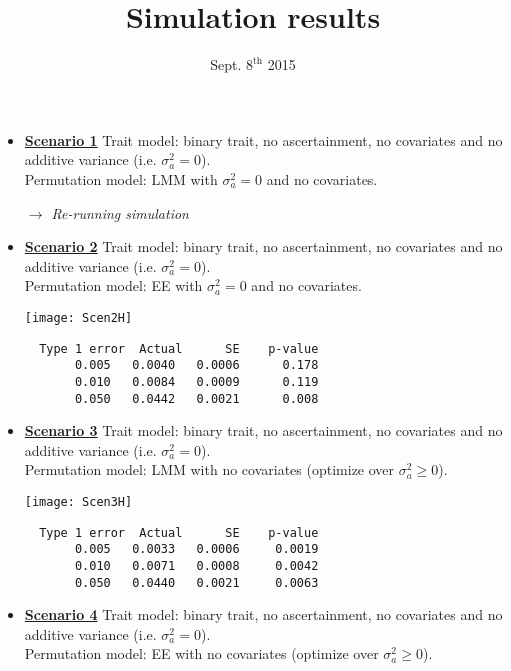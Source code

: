 \documentclass[11pt,a4paper]{article}
\title{Simulation results}
\date{\vspace{-6ex}Sept. $8^{\text{th}}$ 2015}
\begin{document}
\maketitle

\begin{itemize}
\item \underline{\bf Scenario 1}
Trait model: binary trait, no ascertainment, no covariates and no additive variance (i.e. $\sigma_a^2=0$).\\
Permutation model: LMM with $\sigma_a^2=0$ and no covariates.

\textit{$\rightarrow$ Re-running simulation}

\item \underline{\bf Scenario 2}
Trait model: binary trait, no ascertainment, no covariates and no additive variance (i.e. $\sigma_a^2=0$).\\
Permutation model: EE with $\sigma_a^2=0$ and no covariates.

\begin{minipage}{.5\textwidth}
\texttt{[image: Scen2H]}
\end{minipage}
\begin{minipage}{.5\textwidth}
\begin{verbatim}
  Type 1 error  Actual      SE    p-value
       0.005   0.0040   0.0006      0.178
       0.010   0.0084   0.0009      0.119
       0.050   0.0442   0.0021      0.008
\end{verbatim}
\end{minipage}
\newpage
\item \underline{\bf Scenario 3}
Trait model: binary trait, no ascertainment, no covariates and no additive variance (i.e. $\sigma_a^2=0$).\\
Permutation model: LMM with no covariates (optimize over $\sigma_a^2\geq0$).

\begin{minipage}{.5\textwidth}
\texttt{[image: Scen3H]}
\end{minipage}
\begin{minipage}{.5\textwidth}
\begin{verbatim}
  Type 1 error  Actual      SE    p-value
       0.005   0.0033   0.0006     0.0019
       0.010   0.0071   0.0008     0.0042
       0.050   0.0440   0.0021     0.0063
\end{verbatim}
\end{minipage}

\item \underline{\bf Scenario 4}
Trait model: binary trait, no ascertainment, no covariates and no additive variance (i.e. $\sigma_a^2=0$).\\
Permutation model: EE with no covariates (optimize over $\sigma_a^2\geq0$).


\end{itemize}
\end{document}

